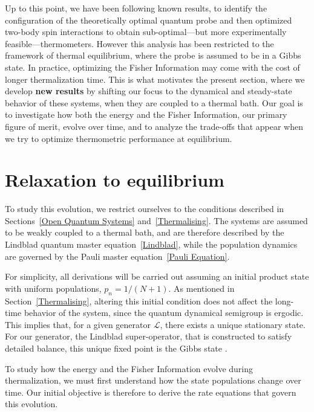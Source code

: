 Up to this point, we have been following known results, to identify the configuration of the theoretically optimal quantum probe and then optimized two-body spin interactions to obtain sub-optimal—but more experimentally feasible—thermometers. However this analysis has been restricted to the framework of thermal equilibrium, where the probe is assumed to be in a Gibbs state. In practice, optimizing the Fisher Information may come with the cost of longer thermalization time. This is what motivates the present section, where we  develop \textbf{new results} by shifting our focus to the dynamical and steady-state behavior of these systems, when they are coupled to a thermal bath. Our goal is to investigate how both the energy and the Fisher Information, our primary figure of merit, evolve over time, and to analyze the trade-offs that appear when we try to optimize thermometric performance at equilibrium.

\section{Relaxation to equilibrium}
To study this evolution, we restrict ourselves to the conditions described in Sections~\ref{Open Quantum Systems} and~\ref{Thermalising}. The systems are assumed to be weakly coupled to a thermal bath, and are therefore described by the Lindblad quantum master equation~\eqref{Lindblad}, while the population dynamics are governed by the Pauli master equation~\eqref{Pauli Equation}.

For simplicity, all derivations will be carried out assuming an initial product state with uniform populations, \( p_n = 1/(N+1) \). As mentioned in Section~\ref{Thermalising}, altering this initial condition does not affect the long-time behavior of the system, since the quantum dynamical semigroup is ergodic. This implies that, for a given generator \( \mathcal{L} \), there exists a unique stationary state. For our generator, the Lindblad super-operator, that is constructed to satisfy detailed balance, this unique fixed point is the Gibbs state \cite{breuer2002open}.

To study how the energy and the Fisher Information evolve during thermalization, we must first understand how the state populations change over time. Our initial objective is therefore to derive the rate equations that govern this evolution.


